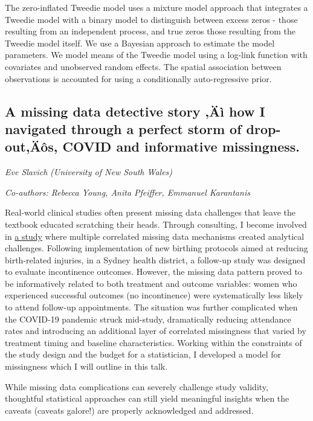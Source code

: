 \documentclass[
]{scrreprt}
\begin{document}
The zero-inflated Tweedie model uses a mixture model approach that
integrates a Tweedie model with a binary model to distinguish between
excess zeros - those resulting from an independent process, and true
zeros those resulting from the Tweedie model itself. We use a Bayesian
approach to estimate the model parameters. We model means of the Tweedie
model using a log-link function with covariates and unobserved random
effects. The spatial association between observations is accounted for
using a conditionally auto-regressive prior.

\subsection{A missing data detective story ‚Äì how I navigated through a
perfect storm of drop-out‚Äôs, COVID and informative
missingness.}\label{a-missing-data-detective-story-uxe4uxec-how-i-navigated-through-a-perfect-storm-of-drop-outuxe4uxf4s-covid-and-informative-missingness.}

\emph{Eve Slavich} \emph{(University of New South
Wales)}

\emph{Co-authors: Rebecca Young, Anita Pfeiffer, Emmanuel Karantanis}

\setlength{\parskip}{0.5em}

Real-world clinical studies often present missing data challenges that
leave the textbook educated scratching their heads. Through consulting,
I become involved in \href{https://doi.org/10.1016/j.cont.2025.101762}{a
study} where multiple correlated missing data mechanisms created
analytical challenges. Following implementation of new birthing
protocols aimed at reducing birth-related injuries, in a Sydney health
district, a follow-up study was designed to evaluate incontinence
outcomes. However, the missing data pattern proved to be informatively
related to both treatment and outcome variables: women who experienced
successful outcomes (no incontinence) were systematically less likely to
attend follow-up appointments. The situation was further complicated
when the COVID-19 pandemic struck mid-study, dramatically reducing
attendance rates and introducing an additional layer of correlated
missingness that varied by treatment timing and baseline
characteristics. Working within the constraints of the study design and
the budget for a statistician, I developed a model for missingness which
I will outline in this talk.

While missing data complications can severely challenge study validity,
thoughtful statistical approaches can still yield meaningful insights
when the caveats (caveats galore!) are properly acknowledged and
addressed.
\end{document}
